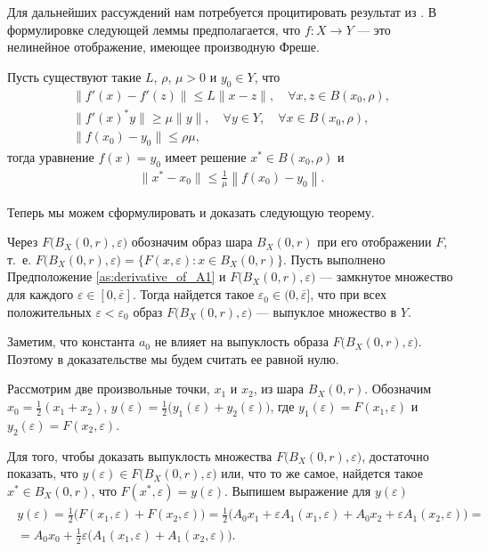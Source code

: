 \documentclass[../main.tex]{subfiles}
\begin{document}
Для дальнейших рассуждений нам потребуется процитировать результат из \cite{Polyak2001, Polyak1964}. 
В формулировке следующей леммы предполагается, что $f:X \to Y$ --- это нелинейное отображение, имеющее производную Фреше.
\begin{lemma}\label{lem:Polyak_lemma}
 Пусть существуют такие $L$, $\rho$, $\mu > 0$ и $y_0 \in Y$, что 
 \begin{gather*}
 \| f'(x) - f'(z) \| \leqslant L \| x - z\|, \quad \forall x,z \in B(x_0,\rho), \\
 \| f'(x)^*y \| \geqslant \mu \|y \|, \quad \forall y \in Y, \quad \forall x \in B(x_0, \rho), \\
 \| f(x_0) - y_0 \| \leqslant \rho \mu,
 \end{gather*}
 тогда уравнение $f(x) = y_0$ имеет решение $x^* \in B(x_0,\rho)$ и 
 \begin{gather*}
 \|x^* - x_0\| \leqslant \frac{1}{\mu} \left\| f(x_0) - y_0 \right\|.
 \end{gather*}
\end{lemma}
Теперь мы можем сформулировать и доказать следующую теорему.
\begin{theorem}\label{th:ImageConvexity}
 Через $F\big(B_X(0,r),\varepsilon\big)$ обозначим образ шара $B_X(0, r)$ при его отображении $F$, т.~е. $F\big(B_X(0,r),\varepsilon\big) = \big\{F(x,\varepsilon): x\in B_X(0, r)\big\}$.
 Пусть выполнено Предположение \ref{as:derivative_of_A1} и $F\big(B_X(0,r),\varepsilon\big)$ --- замкнутое множество для каждого $\varepsilon \in [0, \overline{\varepsilon}]$. 
Тогда найдется такое $ \varepsilon_0 \in (0, \overline{\varepsilon}]$, что при всех положительных $\varepsilon < \varepsilon_0$ образ $F\big(B_X(0,r),\varepsilon\big)$ --- выпуклое множество в $Y$. 
\end{theorem}
\doc
Заметим, что константа $a_0$ не влияет на выпуклость образа $F\big(B_X(0,r),\varepsilon\big)$. 
Поэтому в доказательстве мы будем считать ее равной нулю.

Рассмотрим две произвольные точки, $x_1$ и $x_2$, из шара $B_X(0,r)$. 
Обозначим $x_0 = \frac{1}{2}(x_1 + x_2)$, $y(\varepsilon) = \frac{1}{2}\big(y_1(\varepsilon) + y_2(\varepsilon)\big)$, где $y_1(\varepsilon) = F(x_1, \varepsilon)$ и $y_2(\varepsilon) = F(x_2, \varepsilon)$. 

Для того, чтобы доказать выпуклость множества $F\big(B_X(0,r),\varepsilon\big)$, достаточно показать, что $y(\varepsilon) \in F\big(B_X(0,r),\varepsilon\big)$ или, что то же самое, найдется такое $x^* \in B_X(0,r) $, что $F(x^*, \varepsilon) = y(\varepsilon) $.
Выпишем выражение для $y(\varepsilon)$
\begin{gather}\label{y}
 \begin{gathered}
 y(\varepsilon)=
 \frac{1}{2} \big(
 F(x_1,\varepsilon)+ 
 F(x_2,\varepsilon)
 \big) = 
 \frac{1}{2} \big(
 A_0 x_1 +
 \varepsilon A_1(x_1,\varepsilon) +
 A_0 x_2 +
 \varepsilon A_1(x_2,\varepsilon) 
 \big) = \\ = A_0 x_0 + 
 \frac{1}{2} \varepsilon \big( 
 A_1(x_1,\varepsilon)+ 
 A_1(x_2,\varepsilon)
 \big).
 \end{gathered}
\end{gather}
\end{document}
